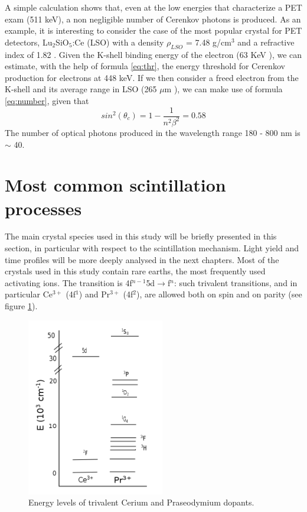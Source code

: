 A simple calculation shows that, even at the low energies that characterize a PET exam (511 keV), a non negligible number of Cerenkov photons is produced.
As an example, it is interesting to consider the case of the most popular crystal for PET detectors, Lu$_{2}$SiO$_{5}$:Ce (LSO) with a density $\rho _{LSO}$ = 7.48 g/cm$^{3}$ and a refractive index of 1.82 \cite{jellison2012}.
Given the K-shell binding energy of the electron (63 KeV \cite{xdata2009}), we can estimate, with the help of formula  \ref{eq:thr}, the energy threshold for Cerenkov production for electrons at 448 keV.
If we then consider a freed electron from the K-shell and its average range in LSO (265 $\mu$m \cite{nist2005}), we can make use of formula \ref{eq:number}, given that
\begin{equation}
sin ^{2}(\theta _{c}) = 1 - \frac{1}{n^{2}\beta ^{2}} = 0.58
\end{equation}
The number of optical photons produced in the wavelength range 180 - 800 nm is $\sim$ 40.


\section{Most common scintillation processes}
The main crystal species used in this study will be briefly presented in this section, in particular with respect to the scintillation mechanism. Light yield and time profiles will be more deeply analysed in the next chapters.
Most of the crystals used in this study contain rare earths, the most frequently used activating ions. The transition is 4f$^{n-1}$5d$\rightarrow$f$^{n}$: such trivalent transitions, and in particular Ce$^{3+}$ (4f$^{1}$) and Pr$^{3+}$ (4f$^{2}$), are allowed both on spin and on parity (see figure \ref{fig:ce_doped}).
\begin{figure}
\centering
\includegraphics[width=6cm]{../Pictures/Chapter_2/Ce_pr.png}
\caption[Cerium based scintillators]{Energy levels of trivalent Cerium and Praseodymium dopants.}
\label{fig:ce_doped}
\end{figure}

